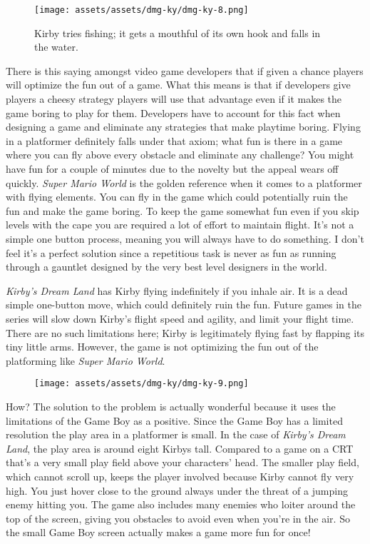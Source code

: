 \documentclass{book}
\begin{document}
\begin{figure}[hbt]
\vskip 10pt
\centering \texttt{[image: assets/assets/dmg-ky/dmg-ky-8.png]}\par\pagetwodescription Kirby tries fishing; it gets a mouthful of its own hook and falls in the water.
\vskip 6pt
\end{figure}

There is this saying amongst video game developers that if given a chance players will optimize the fun out of a game. What this means is that if developers give players a cheesy strategy players will use that advantage even if it makes the game boring to play for them. Developers have to account for this fact when designing a game and eliminate any strategies that make playtime boring. Flying in a platformer definitely falls under that axiom; what fun is there in a game where you can fly above every obstacle and eliminate any challenge? You might have fun for a couple of minutes due to the novelty but the appeal wears off quickly. \emph{Super Mario World} is the golden reference when it comes to a platformer with flying elements. You can fly in the game which could potentially ruin the fun and make the game boring. To keep the game somewhat fun even if you skip levels with the cape you are required a lot of effort to maintain flight. It’s not a simple one button process, meaning you will always have to do something. I don’t feel it’s a perfect solution since a repetitious task is never as fun as running through a gauntlet designed by the very best level designers in the world.

\emph{Kirby’s Dream Land} has Kirby flying indefinitely if you inhale air. It is a dead simple one-button move, which could definitely ruin the fun. Future games in the series will slow down Kirby’s flight speed and agility, and limit your flight time. There are no such limitations here; Kirby is legitimately flying fast by flapping its tiny little arms. However, the game is not optimizing the fun out of the platforming like \emph{Super Mario World}.

\begin{figure}[hbt]
\vskip 10pt
\centering \texttt{[image: assets/assets/dmg-ky/dmg-ky-9.png]}
\vskip 6pt
\end{figure}

How? The solution to the problem is actually wonderful because it uses the limitations of the Game Boy as a positive. Since the Game Boy has a limited resolution the play area in a platformer is small. In the case of \emph{Kirby’s Dream Land}, the play area is around eight Kirbys tall. Compared to a game on a CRT that’s a very small play field above your characters’ head. The smaller play field, which cannot scroll up, keeps the player involved because Kirby cannot fly very high. You just hover close to the ground always under the threat of a jumping enemy hitting you. The game also includes many enemies who loiter around the top of the screen, giving you obstacles to avoid even when you’re in the air. So the small Game Boy screen actually makes a game more fun for once!
\end{document}
